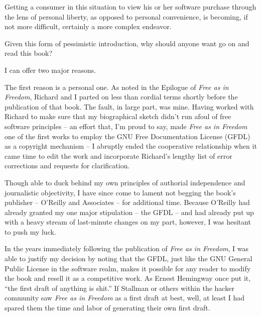 \ifdefined\eng
Getting a consumer in this situation to view his or her software  
purchase through the lens of personal liberty, as opposed to personal  
convenience, is becoming, if not more difficult, certainly a more  
complex endeavor.
\fi

\ifdefined\chs

\fi

\ifdefined\eng
Given this form of pessimistic introduction, why should anyone want go  
on and read this book?
\fi

\ifdefined\chs

\fi

\ifdefined\eng
I can offer two major reasons.
\fi

\ifdefined\chs

\fi

\ifdefined\eng
The first reason is a personal one. As noted in the Epilogue of
\textit{Free as in Freedom}, Richard and I parted on less than cordial
terms shortly before the publication of that book. The fault, in large
part, was mine. Having worked with Richard to make sure that my
biographical sketch didn't run afoul of free software principles -- an
effort that, I'm proud to say, made \textit{Free as in Freedom} one of
the first works to employ the GNU Free Documentation License (GFDL) as
a copyright mechanism -- I abruptly ended the cooperative relationship
when it came time to edit the work and incorporate Richard's lengthy
list of error corrections and requests for clarification.
\fi

\ifdefined\chs

\fi

\ifdefined\eng
Though able to duck behind my own principles of authorial independence
and journalistic objectivity, I have since come to lament not begging
the book's publisher -- O'Reilly and Associates -- for additional time.
Because O'Reilly had already granted my one major stipulation -- the
GFDL -- and had already put up with a heavy stream of last-minute
changes on my part, however, I was hesitant to push my luck.
\fi

\ifdefined\chs

\fi

\ifdefined\eng
In the years immediately following the publication of \textit{Free as
  in Freedom}, I was able to justify my decision by noting that the
GFDL, just like the GNU General Public License in the software realm,
makes it possible for any reader to modify the book and resell it as a
competitive work. As Ernest Hemingway once put it, ``the first draft
of anything is shit.'' If Stallman or others within the hacker
community saw \textit{Free as in Freedom} as a first draft at best,
well, at least I had spared them the time and labor of generating
their own first draft.
\fi

